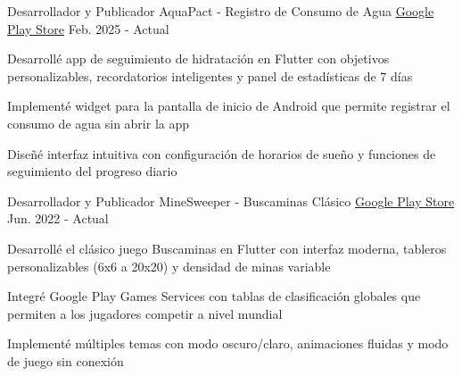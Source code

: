 
\begin{cventries}

  \cventry
    {Desarrollador y Publicador} %
    {AquaPact - Registro de Consumo de Agua} %
    {\href{https://play.google.com/store/apps/details?id=org.zp1ke.aquapact}{Google Play Store}} %
    {Feb. 2025 - Actual} %
    {
      \begin{cvitems} %
        \item {Desarrollé app de seguimiento de hidratación en Flutter con objetivos personalizables, recordatorios inteligentes y panel de estadísticas de 7 días}
        \item {Implementé widget para la pantalla de inicio de Android que permite registrar el consumo de agua sin abrir la app}
        \item {Diseñé interfaz intuitiva con configuración de horarios de sueño y funciones de seguimiento del progreso diario}
      \end{cvitems}
    }

  \cventry
    {Desarrollador y Publicador} %
    {MineSweeper - Buscaminas Clásico} %
    {\href{https://play.google.com/store/apps/details?id=com.h4j4x.minesweeper}{Google Play Store}} %
    {Jun. 2022 - Actual} %
    {
      \begin{cvitems} %
        \item {Desarrollé el clásico juego Buscaminas en Flutter con interfaz moderna, tableros personalizables (6x6 a 20x20) y densidad de minas variable}
        \item {Integré Google Play Games Services con tablas de clasificación globales que permiten a los jugadores competir a nivel mundial}
        \item {Implementé múltiples temas con modo oscuro/claro, animaciones fluidas y modo de juego sin conexión}
      \end{cvitems}
    }


\end{cventries}
